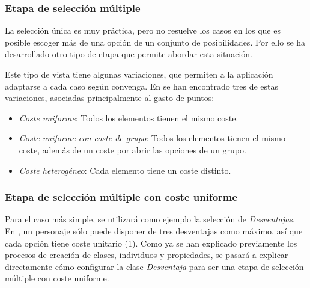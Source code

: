 \subsubsection{Etapa de selección múltiple}
La selección única es muy práctica, pero no resuelve los casos en los que es posible escoger más de una opción 
de un conjunto de posibilidades. Por ello se ha desarrollado otro tipo de etapa que permite abordar esta situación.\medskip

Este tipo de vista tiene algunas variaciones, que permiten a la aplicación adaptarse a cada caso según convenga.
En \anima se han encontrado tres de estas variaciones, asociadas principalmente al gasto de puntos:

\begin{itemize}
    \item \textit{Coste uniforme}: Todos los elementos tienen el mismo coste.
    \item \textit{Coste uniforme con coste de grupo}: Todos los elementos tienen el mismo coste, además de un coste por 
    abrir las opciones de un grupo.
    \item \textit{Coste heterogéneo}: Cada elemento tiene un coste distinto.
\end{itemize}

\subsubsection{Etapa de selección múltiple con coste uniforme} \label{MultipleChoiceStaticLimit}
Para el caso más simple, se utilizará como ejemplo la selección de \textit{Desventajas}. En \anima, un personaje sólo 
puede disponer de tres desventajas como máximo, así que cada opción tiene coste unitario (1). Como ya se han explicado 
previamente los procesos de creación de clases, individuos y propiedades, se pasará a explicar directamente cómo 
configurar la clase \textit{Desventaja} para ser una etapa de selección múltiple con coste uniforme.

